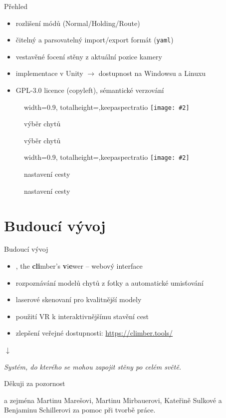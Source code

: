 \documentclass[czech]{beamer}
\makeatletter
\newcommand{\fitimage}[2][\@nil]{
	\begin{figure}
		\begin{adjustbox}{width=0.9\textwidth, totalheight=\textheight-2\baselineskip-2\baselineskip,keepaspectratio}
			\texttt{[image: \#2]}
		\end{adjustbox}
		\def\tmp{#1}%
	 \ifx\tmp\@nnil
			\else
			\caption*{#1}
		\fi
	\end{figure}
}
\makeatother
\begin{document}
	\begin{frame}{Přehled}
		\begin{itemize}
			\item rozlišení módů (Normal/Holding/Route)
			\item čitelný a parsovatelný import/export formát (\texttt{yaml})
			\item vestavěné focení stěny z aktuální pozice kamery
			\vspace{0.7em}
			\item implementace v Unity \(\rightarrow\) dostupnost na Windowsu a Linuxu
			\item GPL-3.0 licence (copyleft), sémantické verzování
		\end{itemize}

		\begin{minipage}[t]{0.5\textwidth}
			\fitimage[\centering výběr chytů]{images/picker.jpg}
		\end{minipage}%
		\hfill
		\begin{minipage}[t]{0.5\textwidth}
			\fitimage[\centering nastavení cesty]{images/settings.jpg}
		\end{minipage}
	\end{frame}

	\section{Budoucí vývoj}

	\begin{frame}{Budoucí vývoj}
		\begin{itemize}
			\item \raisebox{-0.07em}{}, the \textbf{cli}mber's \textbf{v}i\textbf{e}wer -- webový interface
			\item rozpoznávání modelů chytů z fotky a automatické umisťování
			\item laserové skenovaní pro kvalitnější modely
			\item použití VR k interaktivnějšímu stavění cest
			\item zlepšení veřejné dostupnosti: \href{https://climber.tools/}{https://climber.tools/}
		\end{itemize}

		\vspace{0.3em}

		\begin{center}
			{\Large \(\downarrow\)}

			\vspace{1em}

			\textit{Systém, do kterého se mohou zapojit stěny po celém světě.}
		\end{center}
	\end{frame}

	\begin{frame}[focus]
		Děkuji za pozornost
		\vspace{0.5em}

		\normalsize\normalfont a zejména Martinu Marešovi, Martinu Mirbauerovi, Kateřině Sulkové a Benjaminu Schillerovi za pomoc při tvorbě práce.
	\end{frame}
\end{document}
